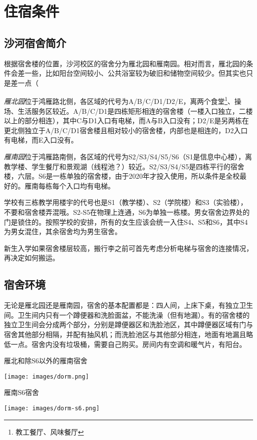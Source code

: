 \section{住宿条件}

\subsection{沙河宿舍简介}

根据宿舍楼的位置，沙河校区的宿舍分为雁北园和雁南园。相对而言，雁北园的条件会差一些，比如阳台空间较小、公共浴室较为破旧和储物空间较少。但其实也只是差一点（

\emph{雁北园}位于鸿雁路北侧，各区域的代号为A/B/C/D1/D2/E，离两个食堂\footnote{教工餐厅、风味餐厅}、操场、生活服务区较近。A/B/C/D1是四栋矩形相连的宿舍楼（一楼入口独立，二楼以上的部分相连），其中C与D1入口有电梯，而A与B入口没有；D2/E是另两栋在更北侧独立于A/B/C/D1宿舍楼且相对较小的宿舍楼，内部也是相连的，D2入口有电梯，而E入口没有。

\emph{雁南园}位于鸿雁路南侧，各区域的代号为S2/S3/S4/S5/S6（S1是信息中心楼），离教学楼、学生餐厅和景观湖（线程池？）较近。S2/S3/S4/S5是四栋平行的宿舍楼，六层。S6是一栋单独的宿舍楼，由于2020年才投入使用，所以条件是全校最好的。雁南每栋每个入口均有电梯。

学校有三栋教学用楼宇的代号也是S1（教学楼）、S2（学院楼）和S3（实验楼），不要和宿舍楼弄混哦。S2-S5在物理上连通，S6为单独一栋楼。男女宿舍边界处的门是锁住的。按照学校的安排，所有的女生应该会统一入住S4、S5和S6，其中S4为男女混住，其余宿舍均为男生宿舍。

新生入学如果宿舍楼层较高，搬行李之前可首先考虑分析电梯与宿舍的连接情况，再决定如何搬运。

\subsection{宿舍环境}

无论是雁北园还是雁南园，宿舍的基本配置都是：四人间，上床下桌，有独立卫生间。卫生间内只有一个蹲便器和洗脸面盆，不能洗澡（但有地漏）。有的宿舍楼的独立卫生间会分成两个部分，分别是蹲便器区和洗脸池区，其中蹲便器区域有门与宿舍其他部分相隔，并配有抽风机；而洗脸池区与其他部分相连，地面有地漏且略低一点。宿舍内没有垃圾桶，需要自己购买。房间内有空调和暖气片，有阳台。

\begin{center}
    \begin{minipage}{0.45\textwidth}
        \centerline{\sffamily\small 雁北和除S6以外的雁南宿舍}
        \centerline{\texttt{[image: images/dorm.png]}}
    \end{minipage}
    \qquad
    \begin{minipage}{0.45\textwidth}
        \centerline{\sffamily\small 雁南S6宿舍}
        \centerline{\texttt{[image: images/dorm-s6.png]}}
    \end{minipage}
\end{center}

